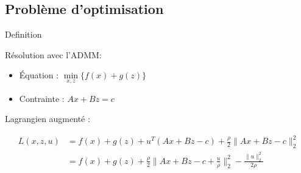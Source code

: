 \subsection{Problème d'optimisation}

\frame{
    \tableofcontents[ 
        currentsubsection, 
    ]
}


\begin{frame}{Definition}

Résolution avec l'ADMM:
\begin{itemize}
    \item Équation : $\min\limits_{x, z} \{ f(x) + g(z) \}$
    \item Contrainte : $Ax + Bz = c$
\end{itemize}

\vspace{5mm}

Lagrangien augmenté :

\begin{align*}
L(x, z, u) 
&= f(x) + g(z) + u^{T}(Ax + Bz - c) 
+ \frac{\rho}{2} \lVert Ax + Bz - c \rVert_{2}^{2} \\
&= f(x) + g(z)
+ \frac{\rho}{2} \lVert Ax + Bz - c + \frac{u}{\rho} \rVert_{2}^{2}
- \frac{\lVert u \rVert_{2}^{2}}{2\rho} \\
\end{align*}

\end{frame}








